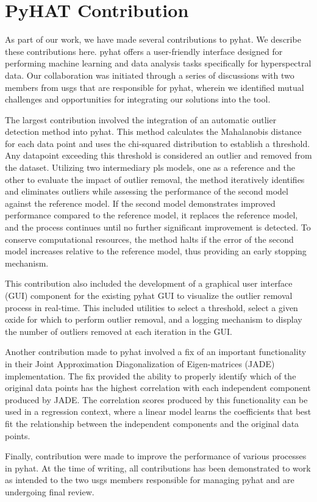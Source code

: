 \section{PyHAT Contribution}\label{sec:pyhat_contribution}
As part of our work, we have made several contributions to \gls{pyhat}. 
We describe these contributions here.
\gls{pyhat} offers a user-friendly interface designed for performing machine learning and data analysis tasks specifically for hyperspectral data.
Our collaboration was initiated through a series of discussions with two members from \gls{usgs} that are responsible for \gls{pyhat}, wherein we identified mutual challenges and opportunities for integrating our solutions into the tool.

The largest contribution involved the integration of an automatic outlier detection method into \gls{pyhat}.
This method calculates the Mahalanobis distance for each data point and uses the chi-squared distribution to establish a threshold.
Any datapoint exceeding this threshold is considered an outlier and removed from the dataset.
Utilizing two intermediary \gls{pls} models, one as a reference and the other to evaluate the impact of outlier removal, the method iteratively identifies and eliminates outliers while assessing the performance of the second model against the reference model. 
If the second model demonstrates improved performance compared to the reference model, it replaces the reference model, and the process continues until no further significant improvement is detected. 
To conserve computational resources, the method halts if the error of the second model increases relative to the reference model, thus providing an early stopping mechanism.

This contribution also included the development of a graphical user interface (GUI) component for the existing \gls{pyhat} GUI to visualize the outlier removal process in real-time.
This included utilities to select a threshold, select a given oxide for which to perform outlier removal, and a logging mechanism to display the number of outliers removed at each iteration in the GUI.

Another contribution made to \gls{pyhat} involved a fix of an important functionality in their Joint Approximation Diagonalization of Eigen-matrices (JADE) implementation.
The fix provided the ability to properly identify which of the original data points has the highest correlation with each independent component produced by JADE.
The correlation scores produced by this functionality can be used in a regression context, where a linear model learns the coefficients that best fit the relationship between the independent components and the original data points.

Finally, contribution were made to improve the performance of various processes in \gls{pyhat}.
At the time of writing, all contributions has been demonstrated to work as intended to the two \gls{usgs} members responsible for managing \gls{pyhat} and are undergoing final review.

 